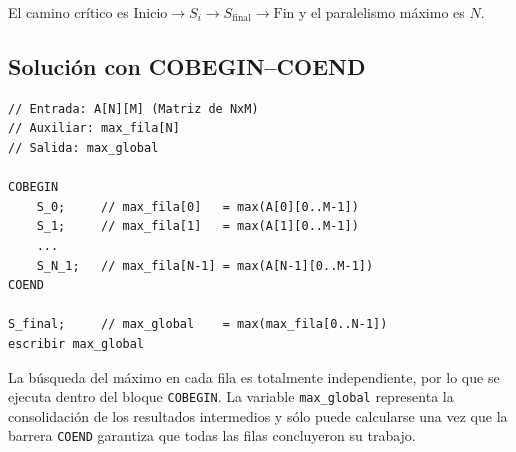 El camino cr\'itico es $\text{Inicio} \rightarrow S_i \rightarrow S_{\text{final}} \rightarrow \text{Fin}$ y el paralelismo m\'aximo es $N$.

\subsection*{Soluci\'on con COBEGIN--COEND}
\begin{lstlisting}
// Entrada: A[N][M] (Matriz de NxM)
// Auxiliar: max_fila[N]
// Salida: max_global

COBEGIN
    S_0;     // max_fila[0]   = max(A[0][0..M-1])
    S_1;     // max_fila[1]   = max(A[1][0..M-1])
    ...
    S_N_1;   // max_fila[N-1] = max(A[N-1][0..M-1])
COEND

S_final;     // max_global    = max(max_fila[0..N-1])
escribir max_global
\end{lstlisting}

\noindent
La b\'usqueda del m\'aximo en cada fila es totalmente independiente, por lo que
se ejecuta dentro del bloque \texttt{COBEGIN}. La variable \texttt{max\_global}
representa la consolidaci\'on de los resultados intermedios y s\'olo puede
calcularse una vez que la barrera \texttt{COEND} garantiza que todas las filas
concluyeron su trabajo.

